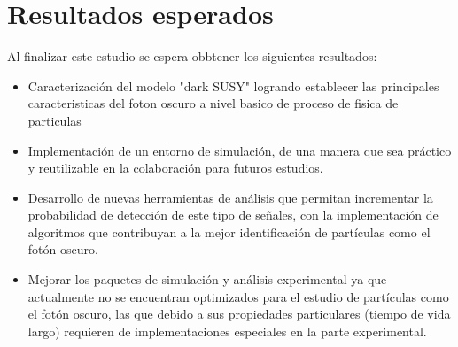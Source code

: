 \chapter{Resultados esperados}

Al finalizar este estudio se espera obbtener los siguientes resultados: 
\begin{itemize}
    \item Caracterización del modelo "dark SUSY" logrando establecer las principales caracteristicas del foton oscuro a nivel basico de proceso de fisica de particulas 
    \item Implementación de un entorno de simulación, de una manera que sea práctico y reutilizable en la colaboración para futuros estudios.
    \item Desarrollo de nuevas herramientas de análisis que permitan incrementar la probabilidad de detección de este tipo de señales, con la implementación de algoritmos que contribuyan a la mejor identificación de partículas como el fotón oscuro.
    \item Mejorar los paquetes de simulación y análisis experimental ya que actualmente no se encuentran optimizados para el estudio de partículas como el fotón oscuro, las que debido a sus propiedades particulares (tiempo de vida largo) requieren de implementaciones especiales en la parte experimental.
\end{itemize}
